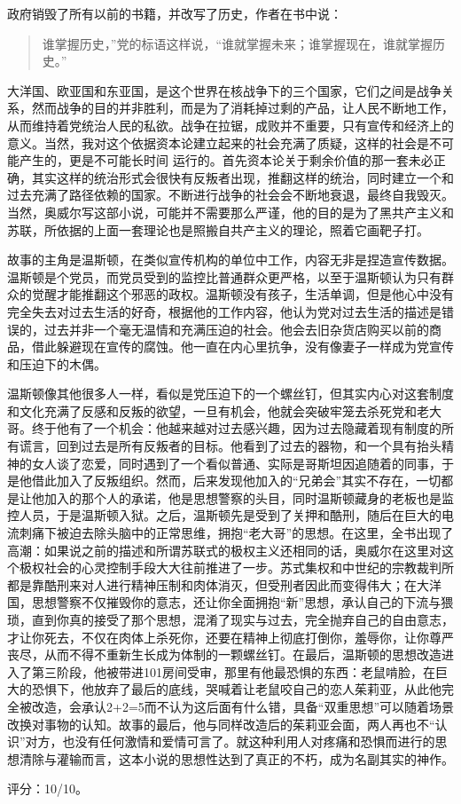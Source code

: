 政府销毁了所有以前的书籍，并改写了历史，作者在书中说：
\begin{quotation}
谁掌握历史，”党的标语这样说，“谁就掌握未来；谁掌握现在，谁就掌握历史。”
\end{quotation}

大洋国、欧亚国和东亚国，是这个世界在核战争下的三个国家，它们之间是战争关系，然而战争的目的并非胜利，而是为了消耗掉过剩的产品，让人民不断地工作，从而维持着党统治人民的私欲。战争在拉锯，成败并不重要，只有宣传和经济上的意义。当然，我对这个依据资本论建立起来的社会充满了质疑，这样的社会是不可能产生的，更是不可能长时间 运行的。首先资本论关于剩余价值的那一套未必正确，其实这样的统治形式会很快有反叛者出现，推翻这样的统治，同时建立一个和过去充满了路径依赖的国家。不断进行战争的社会会不断地衰退，最终自我毁灭。当然，奥威尔写这部小说，可能并不需要那么严谨，他的目的是为了黑共产主义和苏联，所依据的上面一套理论也是照搬自共产主义的理论，照着它画靶子打。

故事的主角是温斯顿，在类似宣传机构的单位中工作，内容无非是捏造宣传数据。温斯顿是个党员，而党员受到的监控比普通群众更严格，以至于温斯顿认为只有群众的觉醒才能推翻这个邪恶的政权。温斯顿没有孩子，生活单调，但是他心中没有完全失去对过去生活的好奇，根据他的工作内容，他认为党对过去生活的描述是错误的，过去并非一个毫无温情和充满压迫的社会。他会去旧杂货店购买以前的商品，借此躲避现在宣传的腐蚀。他一直在内心里抗争，没有像妻子一样成为党宣传和压迫下的木偶。

温斯顿像其他很多人一样，看似是党压迫下的一个螺丝钉，但其实内心对这套制度和文化充满了反感和反叛的欲望，一旦有机会，他就会突破牢笼去杀死党和老大哥。终于他有了一个机会：他越来越对过去感兴趣，因为过去隐藏着现有制度的所有谎言，回到过去是所有反叛者的目标。他看到了过去的器物，和一个具有抬头精神的女人谈了恋爱，同时遇到了一个看似普通、实际是哥斯坦因追随着的同事，于是他借此加入了反叛组织。然而，后来发现他加入的“兄弟会”其实不存在，一切都是让他加入的那个人的承诺，他是思想警察的头目，同时温斯顿藏身的老板也是监控人员，于是温斯顿入狱。之后，温斯顿先是受到了关押和酷刑，随后在巨大的电流刺痛下被迫去除头脑中的正常思维，拥抱“老大哥”的思想。在这里，全书出现了高潮：如果说之前的描述和所谓苏联式的极权主义还相同的话，奥威尔在这里对这个极权社会的心灵控制手段大大往前推进了一步。苏式集权和中世纪的宗教裁判所都是靠酷刑来对人进行精神压制和肉体消灭，但受刑者因此而变得伟大；在大洋国，思想警察不仅摧毁你的意志，还让你全面拥抱“新”思想，承认自己的下流与猥琐，直到你真的接受了那个思想，混淆了现实与过去，完全抛弃自己的自由意志，才让你死去，不仅在肉体上杀死你，还要在精神上彻底打倒你，羞辱你，让你尊严丧尽，从而不得不重新生长成为体制的一颗螺丝钉。在最后，温斯顿的思想改造进入了第三阶段，他被带进101房间受审，那里有他最恐惧的东西：老鼠啃脸，在巨大的恐惧下，他放弃了最后的底线，哭喊着让老鼠咬自己的恋人茱莉亚，从此他完全被改造，会承认2+2=5而不认为这后面有什么错，具备“双重思想”可以随着场景改换对事物的认知。故事的最后，他与同样改造后的茱莉亚会面，两人再也不“认识”对方，也没有任何激情和爱情可言了。就这种利用人对疼痛和恐惧而进行的思想清除与灌输而言，这本小说的思想性达到了真正的不朽，成为名副其实的神作。

评分：10/10。